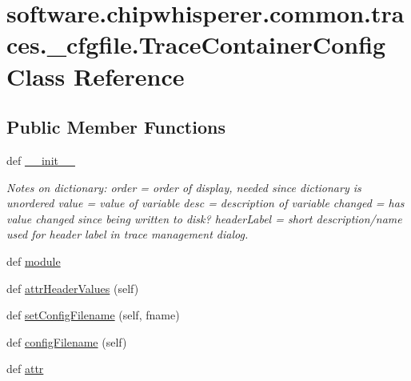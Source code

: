 \hypertarget{classsoftware_1_1chipwhisperer_1_1common_1_1traces_1_1__cfgfile_1_1TraceContainerConfig}{}\section{software.\+chipwhisperer.\+common.\+traces.\+\_\+cfgfile.\+Trace\+Container\+Config Class Reference}
\label{classsoftware_1_1chipwhisperer_1_1common_1_1traces_1_1__cfgfile_1_1TraceContainerConfig}
\subsection*{Public Member Functions}
\begin{DoxyCompactItemize}
\item 
def \hyperlink{classsoftware_1_1chipwhisperer_1_1common_1_1traces_1_1__cfgfile_1_1TraceContainerConfig_a8d113e6450324993f8d5cad558ac31d3}{\+\_\+\+\_\+init\+\_\+\+\_\+}
\begin{DoxyCompactList}\small\item\em Notes on dictionary\+: order = order of display, needed since dictionary is unordered value = value of variable desc = description of variable changed = has value changed since being written to disk? header\+Label = short description/name used for header label in trace management dialog. \end{DoxyCompactList}\item 
def \hyperlink{classsoftware_1_1chipwhisperer_1_1common_1_1traces_1_1__cfgfile_1_1TraceContainerConfig_ab7a5f610e228901eeb43a4c90e48ca9a}{module}
\item 
def \hyperlink{classsoftware_1_1chipwhisperer_1_1common_1_1traces_1_1__cfgfile_1_1TraceContainerConfig_aa376f8c93beab5127bce0a5325f2dcbd}{attr\+Header\+Values} (self)
\item 
def \hyperlink{classsoftware_1_1chipwhisperer_1_1common_1_1traces_1_1__cfgfile_1_1TraceContainerConfig_a1ead14c1a015e51d41bd044b24163849}{set\+Config\+Filename} (self, fname)
\item 
def \hyperlink{classsoftware_1_1chipwhisperer_1_1common_1_1traces_1_1__cfgfile_1_1TraceContainerConfig_a0f7e3b0cf2c971910bc9d1bebcef88e3}{config\+Filename} (self)
\item 
def \hyperlink{classsoftware_1_1chipwhisperer_1_1common_1_1traces_1_1__cfgfile_1_1TraceContainerConfig_afda6373c5ddb839c5c1abce260c70963}{attr}

\end{DoxyCompactItemize}
